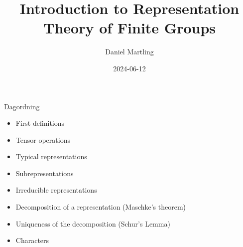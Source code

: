 \documentclass[handout,  12pt]{beamer}
\newcommand{\1}{\mathbf{1}}
\newcommand{\0}{\mathbf{0}}
\begin{document}
	\author{Daniel Martling}
	\title{Introduction to Representation Theory of Finite Groups}
	\date{2024-06-12}
	\begin{frame}
		\maketitle
	\end{frame}
	\begin{frame}{Dagordning}
		\begin{itemize}
			\item First definitions
			\item Tensor operations
			\item Typical representations
			\item Subrepresentations
			\item Irreducible representations
			\item Decomposition of a representation (Maschke's theorem)
			\item Uniqueness of the decomposition (Schur's Lemma)
			\item Characters
		\end{itemize}
	\end{frame}
	
\end{document}
